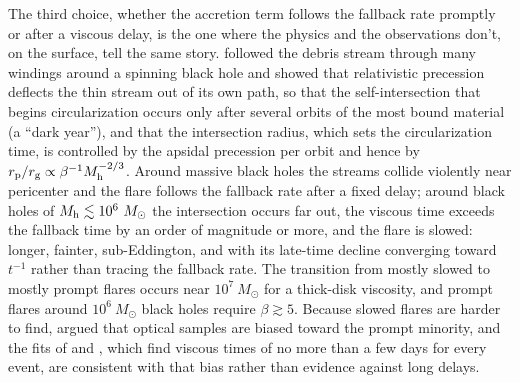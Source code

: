 \documentclass[twocolumn,pdftex]{aastex701}
\newcommand{\msun}{M_{\odot}\xspace}
\begin{document}
The third choice, whether the accretion term follows the fallback rate promptly or after a viscous delay, is the one where the physics and the observations don't, on the surface, tell the same story. \citet{Guillochon:2015a} followed the debris stream through many windings around a spinning black hole and showed that relativistic precession deflects the thin stream out of its own path, so that the self-intersection that begins circularization occurs only after several orbits of the most bound material (a ``dark year''), and that the intersection radius, which sets the circularization time, is controlled by the apsidal precession per orbit and hence by $r_{\rm p}/r_{\rm g} \propto \beta^{-1} M_{\rm h}^{-2/3}$. Around massive black holes the streams collide violently near pericenter and the flare follows the fallback rate after a fixed delay; around black holes of $M_{\rm h} \lesssim 10^{6}~\msun$ the intersection occurs far out, the viscous time exceeds the fallback time by an order of magnitude or more, and the flare is slowed: longer, fainter, sub-Eddington, and with its late-time decline converging toward $t^{-1}$ rather than tracing the fallback rate. The transition from mostly slowed to mostly prompt flares occurs near $10^{7}~\msun$ for a thick-disk viscosity, and prompt flares around $10^{6}~\msun$ black holes require $\beta \gtrsim 5$. Because slowed flares are harder to find, \citet{Guillochon:2015a} argued that optical samples are biased toward the prompt minority, and the fits of \citet{Mockler:2019a} and \citet{Nicholl:2022a}, which find viscous times of no more than a few days for every event, are consistent with that bias rather than evidence against long delays.
\end{document}
